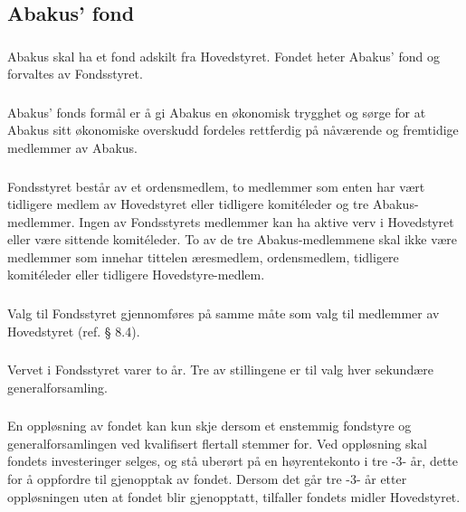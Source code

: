 \subsection{Abakus’ fond}

\subsubsection{}
Abakus skal ha et fond adskilt fra Hovedstyret. Fondet heter Abakus’ fond og forvaltes av Fondsstyret.

\subsubsection{}
Abakus’ fonds formål er å gi Abakus en økonomisk trygghet og sørge for at Abakus sitt
økonomiske overskudd fordeles rettferdig på nåværende og fremtidige medlemmer av Abakus.

\subsubsection{}
Fondsstyret består av et ordensmedlem, to medlemmer som enten har vært tidligere medlem av
Hovedstyret eller tidligere komitéleder og tre Abakus-medlemmer. Ingen av Fondsstyrets medlemmer kan ha
aktive verv i Hovedstyret eller være sittende komitéleder. To av de tre Abakus-medlemmene skal ikke være medlemmer som
innehar tittelen æresmedlem, ordensmedlem, tidligere komitéleder eller tidligere Hovedstyre-medlem.

\subsubsection{}
Valg til Fondsstyret gjennomføres på samme måte som valg til medlemmer av Hovedstyret (ref. § 8.4).

\subsubsection{}
Vervet i Fondsstyret varer to år. Tre av stillingene er til valg hver sekundære generalforsamling.

\subsubsection{}
En oppløsning av fondet kan kun skje dersom et enstemmig fondstyre og generalforsamlingen
ved kvalifisert flertall stemmer for. Ved oppløsning skal fondets investeringer selges, og stå
uberørt på en høyrentekonto i tre -3- år, dette for å oppfordre til gjenopptak av fondet. Dersom
det går tre -3- år etter oppløsningen uten at fondet blir gjenopptatt, tilfaller fondets midler
Hovedstyret.

